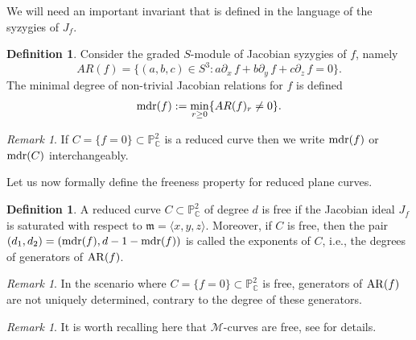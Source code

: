 \documentclass[11pt]{article}
\theoremstyle{plain}
\theoremstyle{definition}
\newtheorem{definition}[theorem]{Definition}
\theoremstyle{remark}
\newtheorem{remark}[theorem]{Remark}
\begin{document}
We will need an important invariant that is defined in the language of the syzygies of $J_{f}$.
\begin{definition}
Consider the graded $S$-module of Jacobian syzygies of $f$, namely $$AR(f)=\{(a,b,c)\in S^3 : a\partial_{x} \, f + b \partial_{y} \, f + c \partial_{z} \, f = 0 \}.$$
The minimal degree of non-trivial Jacobian relations for $f$ is defined
$${\rm mdr}(f):=\min_{r\geq 0}\{AR(f)_r\neq 0\}.$$ 
\end{definition}
\begin{remark}
If $C = \{f=0\} \subset \mathbb{P}^{2}_{\mathbb{C}}$ is a reduced curve then we write ${\rm mdr}(f)$ or ${\rm mdr}(C)$ interchangeably.
\end{remark}
Let us now formally define the freeness property for reduced plane curves.
\begin{definition}
A reduced curve $C \subset \mathbb{P}^{2}_{\mathbb{C}}$ of degree $d$ is free if the Jacobian ideal $J_{f}$ is saturated with respect to $\mathfrak{m} = \langle x,y,z\rangle$. Moreover, if $C$ is free, then the pair $(d_{1}, d_{2}) = ({\rm mdr}(f), d - 1 - {\rm mdr}(f))$ is called the exponents of $C$, i.e., the degrees of generators of ${\rm AR}(f)$.
\end{definition}
\begin{remark}
In the scenario where $C = \{f=0\}\subset \mathbb{P}^{2}_{\mathbb{C}}$ is free, generators of ${\rm AR}(f) $ are not uniquely determined, contrary to the degree of these generators. 
\end{remark}
\begin{remark}
It is worth recalling here that $\mathscr{M}$-curves are free, see \cite{JanLes} for details.
\end{remark}
\end{document}
